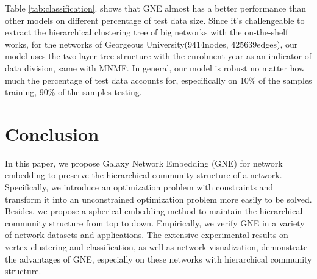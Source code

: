 \documentclass{article}
\theoremstyle{definition}
\begin{document}
	Table \ref{tab:classification}. shows that GNE almost has a better performance than other models on different percentage of test data size. Since it's challengeable to extract the hierarchical clustering tree of big networks with the on-the-shelf works, for the networks of Georgeous University(9414nodes, 425639edges), our model uses the two-layer tree structure with the enrolment year as an indicator of data division, same with MNMF. In general, our model is robust no matter how much the percentage of test data accounts for, especifically on 10\% of the samples training, 90\% of the samples testing.
 
 	\section{Conclusion}
 	In this paper, we propose Galaxy Network Embedding (GNE) for network embedding to preserve the hierarchical community structure of a network. 
 	Specifically, we introduce an optimization problem with constraints and transform it into an unconstrained optimization problem more easily to be solved. Besides, we propose a spherical embedding method to maintain the hierarchical community structure from top to down. 
 	Empirically, we verify GNE in a variety of network datasets and applications. The extensive experimental results on vertex clustering and classification, as well as network visualization, demonstrate the advantages of GNE, especially on these networks with hierarchical community structure.



\end{document}
